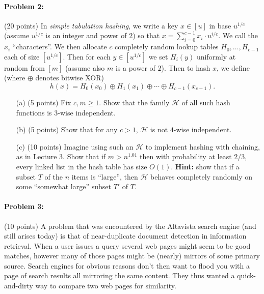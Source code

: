 \documentclass[12pt]{article}
\begin{document}
\paragraph{Problem 2:} (20 points) In {\em simple tabulation hashing}, we write a key $x\in[u]$ in base $u^{1/c}$ (assume $u^{1/c}$ is an integer and power of $2$) so that $x = \sum_{i=0}^{c-1} x_i \cdot u^{i/c}$. We call the $x_i$ ``characters''. We then allocate $c$ completely random lookup tables $H_0,\ldots,H_{c-1}$ each of size $[u^{1/c}]$. Then for each $y\in[u^{1/c}]$ we set $H_i(y)$ uniformly at random from $[m]$ (assume also $m$ is a power of $2$). Then to hash $x$, we define (where $\oplus$ denotes bitwise XOR)
$$h(x) = H_0(x_0)\oplus H_1(x_1)\oplus \cdots \oplus H_{c-1}(x_{c-1}) .$$
\begin{itemize}
\item[(a)] (5 points) Fix $c,m\ge 1$. Show that the family $\mathcal{H}$ of all such hash functions is $3$-wise independent.
\item[(b)] (5 points) Show that for any $c>1$, $\mathcal{H}$ is not $4$-wise independent.
\item[(c)] (10 points) Imagine using such an $\mathcal{H}$ to implement hashing with chaining, as in Lecture 3. Show that if $m > n^{1.01}$ then with probability at least $2/3$, every linked list in the hash table has size $O(1)$. \textbf{Hint:} show that if a subset $T$ of the $n$ items is ``large'', then $\mathcal{H}$ behaves completely randomly on some ``somewhat large'' subset $T'$ of $T$.
\end{itemize}

\paragraph{Problem 3:} (10 points) A problem that was encountered by the Altavista search engine (and still arises today) is that of near-duplicate document detection in information retrieval. When a user issues a query several web pages might seem to be good matches, however many of those pages might be (nearly) mirrors of some primary source. Search engines for obvious reasons don't then want to flood you with a page of search results all mirroring the same content. They thus wanted a quick-and-dirty way to compare two web pages for similarity.
\end{document}
